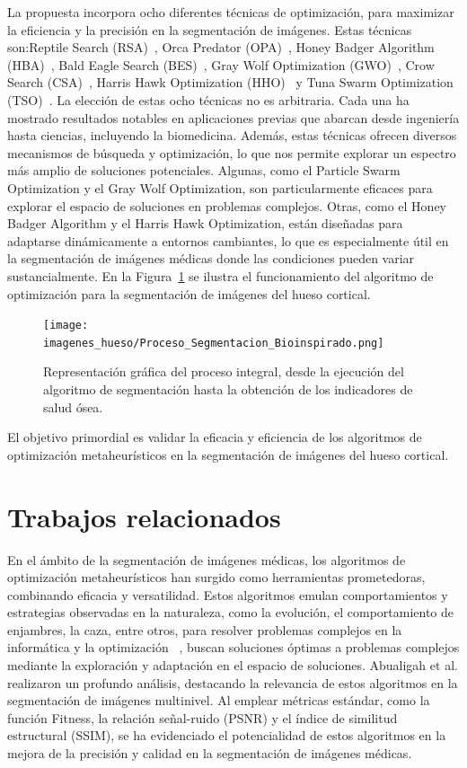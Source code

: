 \documentclass[conference]{IEEEtran}
\begin{document}
\noindent La propuesta incorpora ocho diferentes técnicas de optimización, para maximizar la eficiencia y la precisión en la segmentación de imágenes. Estas técnicas son:Reptile Search (RSA)~\cite{Abualigah2022}, Orca Predator (OPA)~\cite{Jiang2022}, Honey Badger Algorithm (HBA)~\cite{Hashim2022}, Bald Eagle Search (BES)~\cite{Alsattar2019}, Gray Wolf Optimization (GWO)~\cite{Mirjalili2014}, Crow Search (CSA)~\cite{Askarzadeh2016}, Harris Hawk Optimization (HHO)~\cite{Heidari2019}  y Tuna Swarm Optimization (TSO)~\cite{Xie2021}. La elección de estas ocho técnicas no es arbitraria. Cada una ha mostrado resultados notables en aplicaciones previas que abarcan desde ingeniería hasta ciencias, incluyendo la biomedicina. Además, estas técnicas ofrecen diversos mecanismos de búsqueda y optimización, lo que nos permite explorar un espectro más amplio de soluciones potenciales. Algunas, como el Particle Swarm Optimization y el Gray Wolf Optimization, son particularmente eficaces para explorar el espacio de soluciones en problemas complejos. Otras, como el Honey Badger Algorithm y el Harris Hawk Optimization, están diseñadas para adaptarse dinámicamente a entornos cambiantes, lo que es especialmente útil en la segmentación de imágenes médicas donde las condiciones pueden variar sustancialmente. En la Figura~\ref{fig:z} se ilustra el funcionamiento del algoritmo de optimización para la segmentación de imágenes del hueso cortical.

\begin{figure}[ht]
	\centering
	\texttt{[image: imagenes\_hueso/Proceso\_Segmentacion\_Bioinspirado.png]}
	\caption{Representación gráfica del proceso integral, desde la ejecución del algoritmo de segmentación hasta la obtención de los indicadores de salud ósea.}
	\label{fig:z}
\end{figure}

\noindent El objetivo primordial es validar la eficacia y eficiencia de los algoritmos de optimización metaheurísticos en la segmentación de imágenes del hueso cortical.


\section{Trabajos relacionados} \label{sec:rw}

\noindent En el ámbito de la segmentación de imágenes médicas, los algoritmos de optimización metaheurísticos han surgido como herramientas prometedoras, combinando eficacia y versatilidad. Estos algoritmos emulan comportamientos y estrategias observadas en la naturaleza, como la evolución, el comportamiento de enjambres, la caza, entre otros, para resolver problemas complejos en la informática y la optimización ~\cite{Darwish2018}, buscan soluciones óptimas a problemas complejos mediante la exploración y adaptación en el espacio de soluciones. Abualigah et al.\cite{Abualigah2023} realizaron un profundo análisis, destacando la relevancia de estos algoritmos en la segmentación de imágenes multinivel. Al emplear métricas estándar, como la función Fitness, la relación señal-ruido (PSNR) y el índice de similitud estructural (SSIM), se ha evidenciado el potencialidad de estos algoritmos en la mejora de la precisión y calidad en la segmentación de imágenes médicas\cite{Ma2023}.
\end{document}
